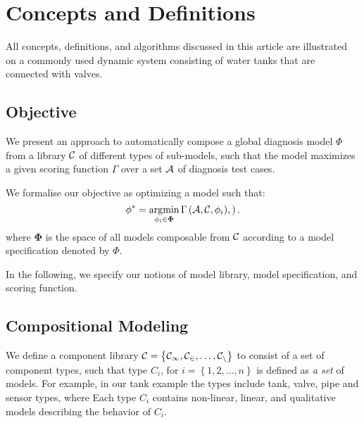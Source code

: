 \section{Concepts and Definitions}\label{sec:concepts}
%
All concepts, definitions, and algorithms discussed in this article
are illustrated on a commonly used dynamic system consisting of water
tanks that are connected with valves.
%
\subsection{Objective}

We present an approach to automatically compose a global diagnosis model $\Phi$ from a library $\cal{C}$ of different types of sub-models, such that the  model  maximizes a given scoring function $\Gamma$ over a set $\cal A$ of diagnosis test cases.

We formalise our objective as optimizing a model such that:
\begin{equation}
\phi^{*} = \operatorname*{\arg\!\min}_{\phi_i \in \mathbf{\Phi}} \Gamma \left( {\cal A}, {\cal{C}}, {\phi_i}),
					 \right).
					\label{obj1}
\end{equation}
where $\mathbf{\Phi}$ is the space of all models composable from $\cal{C}$ according to a model specification denoted by $\Phi$.

In the following, we specify our notions of model library, model specification, and scoring function.

\subsection{Compositional Modeling}
%
We define a component library $\cal{C} = \left\{C_1, C_2, \ldots,
C_n\right\}$ to consist of a set of component types, such that type $C_i$, for $i = \left\{1, 2, \ldots, n\right\}$ is defined as \textit{a set} of models. 
For example, in our tank example the types include tank, valve, pipe and sensor types, where
Each type $C_i$
contains non-linear, linear, and qualitative models describing the behavior of  $C_i$.

